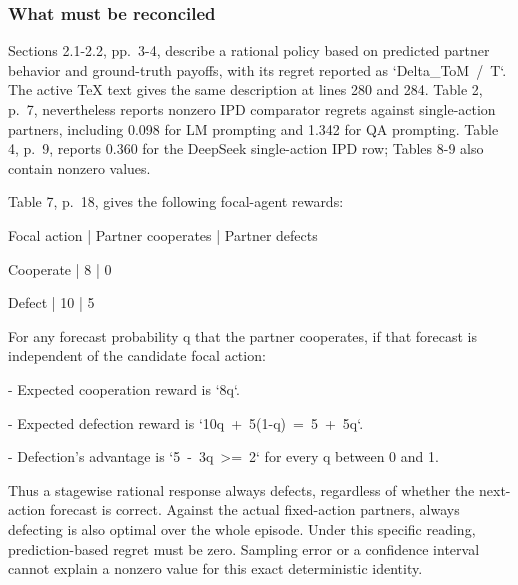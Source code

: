 \documentclass[10pt]{article}
\begin{document}
\subsubsection*{What must be reconciled}
Sections 2.1-2.2, pp. 3-4, describe a rational policy based on predicted partner behavior and ground-truth payoffs, with its regret reported as `Delta\_ToM / T`. The active TeX text gives the same description at lines 280 and 284. Table 2, p. 7, nevertheless reports nonzero IPD comparator regrets against single-action partners, including 0.098 for LM prompting and 1.342 for QA prompting. Table 4, p. 9, reports 0.360 for the DeepSeek single-action IPD row; Tables 8-9 also contain nonzero values.\par
Table 7, p. 18, gives the following focal-agent rewards:\par
Focal action | Partner cooperates | Partner defects\par
Cooperate | 8 | 0\par
Defect | 10 | 5\par
For any forecast probability q that the partner cooperates, if that forecast is independent of the candidate focal action:\par
- Expected cooperation reward is `8q`.\par
- Expected defection reward is `10q + 5(1-q) = 5 + 5q`.\par
- Defection’s advantage is `5 - 3q >= 2` for every q between 0 and 1.\par
Thus a stagewise rational response always defects, regardless of whether the next-action forecast is correct. Against the actual fixed-action partners, always defecting is also optimal over the whole episode. Under this specific reading, prediction-based regret must be zero. Sampling error or a confidence interval cannot explain a nonzero value for this exact deterministic identity.\par
\end{document}
